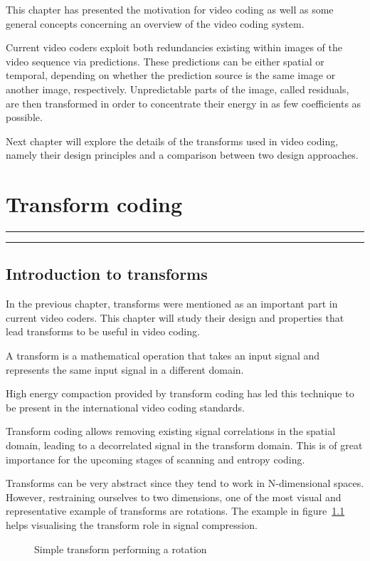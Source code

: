 \documentclass[11pt,a4paper,openright,twoside]{book}
\providecommand{\chaptertoc}{
	\startcontents[chapters]
	\hrule
	\vspace{1em}
	\printcontents[chapters]{}{1}{{\bf\large Contents}}
	\hrule
}
\numberwithin{equation}{section} %
\begin{document}
This chapter has presented the motivation for video coding as well as
some general concepts concerning an overview of the video coding system.

Current video coders exploit both redundancies existing within images of
the video sequence via predictions.
These predictions can be either spatial or temporal, depending on
whether the prediction source is the same image or another image,
respectively.
Unpredictable parts of the image, called residuals, are then transformed
in order to concentrate their energy in as few coefficients as possible.

Next chapter will explore the details of the transforms used in video
coding, namely their design principles and a comparison between two
design approaches.

\chapter{Transform coding}
\label{cha:transform_coding}
\chaptertoc

\section{Introduction to transforms}
\label{sec:introduction_to_transforms}

In the previous chapter, transforms were mentioned as an important part
in current video coders.
This chapter will study their design and properties that lead transforms
to be useful in video coding.

A transform is a mathematical operation that takes an input signal and
represents the same input signal in a different domain.

High energy compaction provided by transform coding has led this
technique to be present in the international video coding standards.

Transform coding allows removing existing signal correlations in the
spatial domain, leading to a decorrelated signal in the transform
domain.
This is of great importance for the upcoming stages of scanning and
entropy coding.

Transforms can be very abstract since they tend to work in N-dimensional
spaces.
However, restraining ourselves to two dimensions, one of the most visual
and representative example of transforms are rotations.
The example in figure~\ref{fig:transform_rotation} helps visualising the
transform role in signal compression.

\begin{figure}[ht]
	\centering
	
	\caption{Simple transform performing a rotation}
	\label{fig:transform_rotation}
\end{figure}
\end{document}
